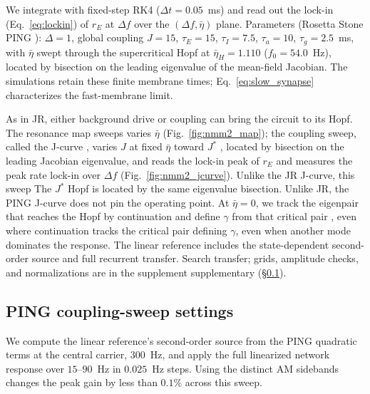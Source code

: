 \documentclass[11pt,a4paper]{article}
\newif\ifjne
\providecommand{\DIFaddtex}[1]{{\protect\color{blue} \sf #1}} %
\providecommand{\DIFdeltex}[1]{{\protect\color{red} \scriptsize #1}} %
\providecommand{\DIFaddbegin}{} %
\providecommand{\DIFaddend}{} %
\providecommand{\DIFdelbegin}{} %
\providecommand{\DIFdelend}{} %
\providecommand{\DIFadd}[1]{\texorpdfstring{\DIFaddtex{#1}}{#1}} %
\providecommand{\DIFdel}[1]{\texorpdfstring{\DIFdeltex{#1}}{}} %
\begin{document}
We integrate with fixed-step RK4 ($\Delta t=0.05$~ms) and read out the lock-in
(Eq.~\eqref{eq:lockin}) of $r_E$ at $\Delta f$ over the $(\Delta f, \bar\eta)$ plane.
Parameters (Rosetta Stone PING \cite{ruffini2025rosetta}): $\Delta=1$, global coupling
$J=15$, $\tau_E=15$, $\tau_I=7.5$, $\tau_a=10$, $\tau_g=2.5$~ms, with $\bar\eta$ swept
through the supercritical Hopf at $\bar\eta_H=1.110$ ($f_0=54.0$~Hz), located by bisection
on the leading eigenvalue of the mean-field Jacobian. The simulations retain these
finite membrane times; Eq.~\eqref{eq:slow_synapse} characterizes the fast-membrane limit.

\DIFdelbegin \DIFdel{As in JR, either background drive or coupling can bring the circuit to its Hopf.
}\DIFdelend The resonance map \DIFdelbegin \DIFdel{sweeps }\DIFdelend \DIFaddbegin \DIFadd{varies }\DIFaddend $\bar\eta$ (Fig.~\ref{fig:nmm2_map}); the
\DIFdelbegin \DIFdel{coupling sweep,
called the }\DIFdelend J-curve \DIFdelbegin \DIFdel{, }\DIFdelend varies $J$ at fixed $\bar\eta$ toward $J^*$ \DIFdelbegin \DIFdel{, located by bisection on the leading
Jacobian eigenvalue, and reads the
lock-in peak of $r_E$ }\DIFdelend \DIFaddbegin \DIFadd{and measures the
peak rate lock-in }\DIFaddend over $\Delta f$ (Fig.~\ref{fig:nmm2_jcurve}).
\DIFdelbegin \DIFdel{Unlike the JR J-curve, this sweep }\DIFdelend \DIFaddbegin \DIFadd{The $J^*$ Hopf is located by the same eigenvalue bisection.
Unlike JR, the PING J-curve }\DIFaddend does not pin the operating point. At
$\bar\eta=0$, \DIFdelbegin \DIFdel{we track the eigenpair that reaches the Hopf by
continuation and define $\gamma$ from that critical pair , even where }\DIFdelend \DIFaddbegin \DIFadd{continuation tracks the critical pair defining $\gamma$,
even when }\DIFaddend another mode dominates\DIFdelbegin \DIFdel{the response}\DIFdelend . The linear reference includes the
state-dependent \DIFdelbegin \DIFdel{second-order }\DIFdelend source and full \DIFdelbegin \DIFdel{recurrent transfer. Search }\DIFdelend \DIFaddbegin \DIFadd{transfer; }\DIFaddend grids, amplitude checks, and
normalizations are \DIFdelbegin \DIFdel{in the supplement }\DIFdelend \DIFaddbegin \DIFadd{supplementary }\DIFaddend (\S\ref{supp:ping-runs}).
\DIFaddbegin

\DIFaddend \ifjne\else
\subsection{PING coupling-sweep settings}\label{supp:ping-runs}
We compute the linear reference's
second-order source from the PING quadratic terms at the central carrier,
$300$~Hz, and apply the full linearized network response over $15$--$90$~Hz
in $0.025$~Hz steps. Using the distinct AM sidebands changes the peak gain by
less than $0.1\%$ across this sweep.
\end{document}
